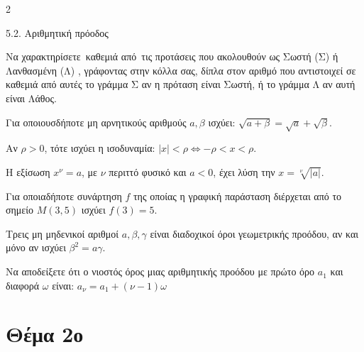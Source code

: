 \begin{ylh}{2}
    \item 5.2. Αριθμητική πρόοδος
\end{ylh}

\begin{alist}
\item Να χαρακτηρίσετε~καθεμιά από~τις προτάσεις που ακολουθούν ως Σωστή (Σ) ή Λανθασμένη (Λ) , γράφοντας στην κόλλα σας, δίπλα στον αριθμό που αντιστοιχεί σε καθεμιά από αυτές το γράμμα Σ αν η πρόταση είναι Σωστή, ή το γράμμα Λ αν αυτή είναι Λάθος.
\begin{rlist}
\item
  Για οποιουσδήποτε μη αρνητικούς αριθμούς $a, \beta$ ισχύει: $\sqrt{a+\beta} = \sqrt{a} + \sqrt{\beta}$.
\item
  Αν $\rho > 0$, τότε ισχύει η ισοδυναμία: $|x| < \rho \Leftrightarrow -\rho < x < \rho$.
\item
  Η εξίσωση $x^\nu = a$, με $\nu$ περιττό φυσικό και $a < 0$, έχει λύση την $x = \sqrt[\nu]{|a|}$.
\item
  Για οποιαδήποτε συνάρτηση $f$ της οποίας η γραφική παράσταση διέρχεται από το σημείο $M(3, 5)$ ισχύει $f(3) = 5$.
\item
  Τρεις μη μηδενικοί αριθμοί $a, \beta, \gamma$ είναι διαδοχικοί όροι γεωμετρικής προόδου, αν και μόνο αν ισχύει $\beta^2 = a\gamma$.
\end{rlist}
\item Να αποδείξετε ότι ο νιοστός όρος μιας αριθμητικής προόδου με πρώτο όρο $a_1$ και διαφορά $\omega$ είναι: $a_\nu = a_1 + (\nu - 1)\omega$
\end{alist}



\section{Θέμα 2ο}

